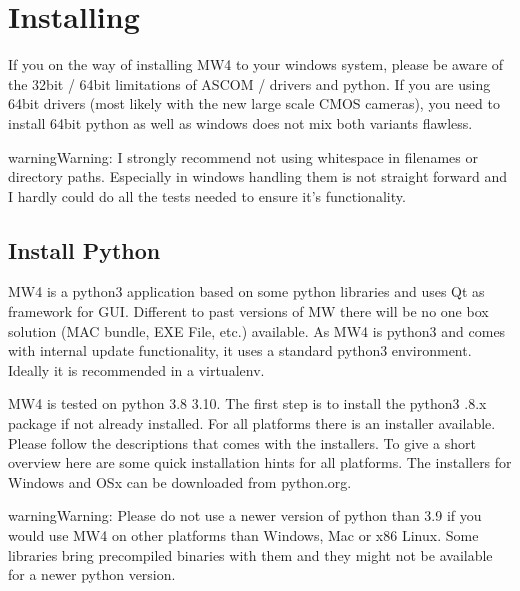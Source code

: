 \documentclass[a4paper,10pt,english]{sphinxmanual}
\begin{document}
\sphinxstepscope


\section{Installing}
\label{\detokenize{install/index:installing}}\label{\detokenize{install/index::doc}}
\sphinxAtStartPar
If you on the way of installing MW4 to your windows system, please be aware of the
32bit / 64bit limitations of ASCOM / drivers and python. If you are using 64bit
drivers (most likely with the new large scale CMOS cameras), you need to install
64bit python as well as windows does not mix both variants flawless.

\begin{sphinxadmonition}{warning}{Warning:}
\sphinxAtStartPar
I strongly recommend not using whitespace in filenames or directory
paths. Especially in windows handling them is not straight forward
and I hardly could do all the tests needed to ensure it’s
functionality.
\end{sphinxadmonition}

\sphinxstepscope


\subsection{Install Python}
\label{\detokenize{install/python:install-python}}\label{\detokenize{install/python::doc}}
\sphinxAtStartPar
MW4 is a python3 application based on some python libraries and uses Qt as
framework for GUI. Different to past versions of MW there will be no one box
solution (MAC bundle, EXE File, etc.) available. As MW4 is python3 and comes with
internal update functionality, it uses a standard python3 environment. Ideally it
is recommended in a virtualenv.

\sphinxAtStartPar
MW4 is tested on python 3.8 \sphinxhyphen{} 3.10. The first step is to install the python3
.8.x package if not already installed. For all platforms there is an installer
available. Please follow the descriptions that comes with the installers. To give
a short overview here are some quick installation hints for all platforms. The
installers for Windows and OSx can be downloaded from python.org.

\begin{sphinxadmonition}{warning}{Warning:}
\sphinxAtStartPar
Please do not use a newer version of python than 3.9 if you would use MW4 on
other platforms than Windows, Mac or x86 Linux. Some libraries bring
precompiled binaries with them and they might not be available for a newer
python version.
\end{sphinxadmonition}
\end{document}
